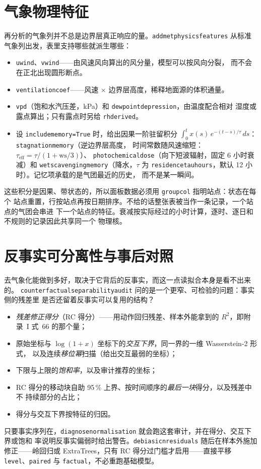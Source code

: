 \documentclass[11pt]{ctexrep}
\newcommand{\nosep}{\setlength{\itemsep}{0pt}\setlength{\parskip}{0pt}\setlength{\topsep}{2pt}}
\newcommand{\codeunderscore}{\textunderscore\allowbreak}
\newcommand{\code}[1]{\texttt{\let\_\codeunderscore #1}}
\begin{document}
\section{气象物理特征}\label{sec:metfeaturestheory}
再分析的气象列并不总是边界层真正响应的量。\code{add\_met\_physics\_features} 从标准
气象列出发，表里支持哪些就派生哪些：
\begin{itemize}\nosep
  \item \code{u\_wind}、\code{v\_wind}——由风速风向算出的风分量，模型可以按风向分裂，
        而不会在正北出现圆形断点。
  \item \code{ventilation\_coef}——风速 $\times$ 边界层高度，稀释地面源的体积通量。
  \item \code{vpd}（饱和水汽压差，kPa）和 \code{dewpoint\_depression}，由温度配合相对
        湿度或露点算出；只有露点时另给 \code{rh\_derived}。
  \item 设 \code{include\_memory=True} 时，给出因果一阶驻留积分
        $\int_0^t x(s)\,e^{-(t-s)/\tau}\,ds$：\code{stagnation\_memory}（逆边界层高度，
        时间常数随风速缩短：$\tau_\text{eff} = \tau/(1 + \mathrm{ws}/3)$）、
        \code{photochemical\_dose}（向下短波辐射，固定 6 小时衰减）和
        \code{wet\_scavenging\_memory}（降水，$\tau$ 为
        \code{residence\_tau\_hours}，默认 12 小时）。记忆项承载的是气团最近的历史，
        而不是某一瞬间。
\end{itemize}
这些积分是因果、带状态的，所以面板数据必须用 \code{group\_col} 指明站点：状态在每个
站点重置，行按站点再按日期排序。不给的话整张表被当作一条记录，一个站点的气团会串进
下一个站点的特征。衰减按实际经过的小时计算，逐时、逐日和不规则的记录因此共享同一个
物理核。

\section{反事实可分离性与事后对照}\label{sec:separability}
去气象化能做到多好，取决于它背后的反事实，而这一点读拟合本身是看不出来的。
\code{counterfactual\_separability\_audit} 问的是一个更窄、可检验的问题：事实侧的残差里
是否还留着反事实可以复用的结构？
\begin{itemize}\nosep
  \item \emph{残差修正得分}（RC 得分）——用动作回归残差、样本外能拿到的 $R^2$，即附录~I
        式~66 的那个量；
  \item 原始坐标与 $\log(1+x)$ 坐标下的\emph{交互下界}，同一界的一维 Wasserstein-2 形式，
        以及连续\emph{移位幂}扫描（给出交互最弱的坐标）；
  \item 下限与上限的\emph{饱和率}，以及审计推荐的坐标；
  \item RC 得分的移动块自助 95\,\% 上界、按时间顺序的\emph{最后一块}得分，以及残差中不
        持续部分的占比；
  \item 得分与交互下界按特征的归因。
\end{itemize}
只要事实序列在，\code{diagnose\_normalisation} 就会跑这套审计，并在得分、交互下界或饱和
率说明反事实偏弱时给出警告。\code{debias\_icn\_residuals} 随后在样本外施加修正——岭回归或
ExtraTrees，只有 RC 得分过门槛才启用——直接平移 \code{level}、\code{paired} 与
\code{factual}，不必重跑基础模型。
\end{document}
